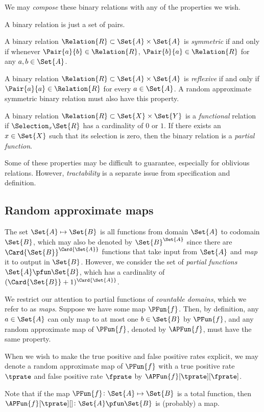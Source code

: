 \documentclass[ ../main.tex]{subfiles}
\begin{document}
We may \emph{compose} these binary relations with any of the properties we wish.






A binary relation is just a set of pairs.


A binary relation $\Relation{R} \subset \Set{A} \times \Set{A}$ is \emph{symmetric} if and only if whenever $\Pair{a}{b} \in \Relation{R}$, $\Pair{b}{a} \in \Relation{R}$ for any $a,b \in \Set{A}$.


A binary relation $\Relation{R} \subset \Set{A} \times \Set{A}$ is \emph{reflexive} if and only if $\Pair{a}{a} \in \Relation{R}$ for every $a \in \Set{A}$.
A random approximate symmetric binary relation must also have this property.


% 
A binary relation $\Relation{R} \subset \Set{X} \times \Set{Y}$ is a \emph{functional} relation if $\Selection_{x} \Set{R}$ has a cardinality of $0$ or $1$. If there exists an $x \in \Set{X}$ such that its selection is zero, then the binary relation is a \emph{partial function}.



\begin{remark}
Some of these properties may be difficult to guarantee, especially for oblivious relations.
However, \emph{tractability} is a separate issue from specification and definition.
\end{remark}

\subsection{Random approximate maps}
\label{sec:map}
The set $\Set{A} \mapsto \Set{B}$ is all functions from domain $\Set{A}$ to codomain $\Set{B}$, which may also be denoted by $\Set{B}^{\Set{A}}$ since there are $\Card{\Set{B}}^{\Card{\Set{A}}}$ functions that take input from $\Set{A}$ and \emph{map} it to output in $\Set{B}$.
However, we consider the set of \emph{partial functions} $\Set{A} \pfun \Set{B}$, which has a cardinality of $(\Card{\Set{B}}+1)^{\Card{\Set{A}}}$.

We restrict our attention to partial functions of \emph{countable domains}, which we refer to as \emph{maps}.
Suppose we have some map $\PFun{f}$. Then, by definition, any $a \in \Set{A}$ can only map to at most one $b \in \Set{B}$ by $\PFun{f}$, and any random approximate map of $\PFun{f}$, denoted by $\APFun{f}$, must have the same property.

\begin{notation}
	When we wish to make the true positive and false positive rates explicit, we may denote a random approximate map of $\PFun{f}$ with a true positive rate $\tprate$ and false positive rate $\fprate$ by $\APFun{f}[\tprate][\fprate]$.
\end{notation}
Note that if the map $\PFun{f} \colon \Set{A} \mapsto \Set{B}$ is a total function, then $\APFun{f}[\tprate][] \colon \Set{A} \pfun \Set{B} $ is (probably) a map.
\end{document}
